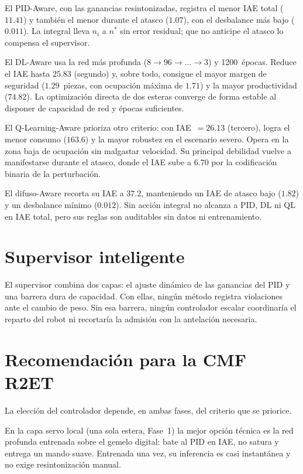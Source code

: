 El PID-Aware, con las ganancias resintonizadas, registra el menor IAE total ($11.41$) y también el menor durante el atasco ($1.07$), con el desbalance más bajo ($0.011$). La integral lleva $n_i$ a $n^*$ sin error residual; que no anticipe el atasco lo compensa el supervisor.

El DL-Aware usa la red más profunda ($8\!\to\!96\!\to\!\dots\!\to\!3$) y 1200~épocas. Reduce el IAE hasta $25.83$ (segundo) y, sobre todo, consigue el mayor margen de seguridad ($1.29$~piezas, con ocupación máxima de $1.71$) y la mayor productividad ($74.82$). La optimización directa de dos esteras converge de forma estable al disponer de capacidad de red y épocas suficientes.

El Q-Learning-Aware prioriza otro criterio: con IAE~$=26.13$ (tercero), logra el menor consumo ($163.6$) y la mayor robustez en el escenario severo. Opera en la zona baja de ocupación sin malgastar velocidad. Su principal debilidad vuelve a manifestarse durante el atasco, donde el IAE sube a $6.70$ por la codificación binaria de la perturbación.

El difuso-Aware recorta su IAE a $37.2$, manteniendo un IAE de atasco bajo ($1.82$) y un desbalance mínimo ($0.012$). Sin acción integral no alcanza a PID, DL ni QL en IAE total, pero sus reglas son auditables sin datos ni entrenamiento.

\section*{Supervisor inteligente}

El supervisor combina dos capas: el ajuste dinámico de las ganancias del PID y una barrera dura de capacidad. Con ellas, ningún método registra violaciones ante el cambio de peso. Sin esa barrera, ningún controlador escalar coordinaría el reparto del robot ni recortaría la admisión con la antelación necesaria.

\section*{Recomendación para la CMF R2ET}

La elección del controlador depende, en ambas fases, del criterio que se priorice.

En la capa servo local (una sola estera, Fase~1) la mejor opción técnica es la red profunda entrenada sobre el gemelo digital: bate al PID en IAE, no satura y entrega un mando suave. Entrenada una vez, su inferencia es casi instantánea y no exige resintonización manual.

